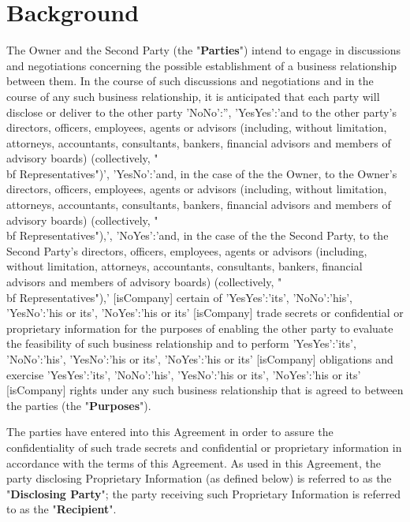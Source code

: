 \documentclass[12pt]{article}
\newcommand{\VAR}[1]{{\color{blue}#1}}
\newcommand{\pronouns}{
    \VAR{
        {
            'YesYes':'its',
            'NoNo':'his',
            'YesNo':'his or its',
            'NoYes':'his or its'
        }[isCompany]
    }
}
\begin{document}
\section{Background}
The Owner and the Second Party (the "{\bf Parties}") intend to engage in discussions and negotiations concerning the possible establishment of a business relationship between them.  In the course of such discussions and negotiations and in the course of any such business relationship, it is anticipated that each party will disclose or deliver to the other party
 \VAR{
    {
        'NoNo':'',
        'YesYes':'and to the other party’s directors, officers, employees, agents or advisors (including, without limitation, attorneys, accountants, consultants, bankers, financial advisors and members of advisory boards) (collectively, "{\\bf Representatives}")',
        'YesNo':'and, in the case of the the Owner, to the Owner’s directors, officers, employees, agents or advisors (including, without limitation, attorneys, accountants, consultants, bankers, financial advisors and members of advisory boards) (collectively, "{\\bf Representatives}"),',
        'NoYes':'and, in the case of the the Second Party, to the Second Party’s directors, officers, employees, agents or advisors (including, without limitation, attorneys, accountants, consultants, bankers, financial advisors and members of advisory boards) (collectively, "{\\bf Representatives}"),'
    }[isCompany]
}
certain of \pronouns trade secrets or confidential or proprietary information for the purposes of enabling the other party to evaluate the feasibility of such business relationship and to perform \pronouns obligations and exercise \pronouns rights under any such business relationship that is agreed to between the parties (the "{\bf Purposes}").

The parties have entered into this Agreement in order to assure the confidentiality of such trade secrets and confidential or proprietary information in accordance with the terms of this Agreement.  As used in this Agreement, the party disclosing Proprietary Information (as defined below) is referred to as the "{\bf Disclosing Party}"; the party receiving such Proprietary Information is referred to as the "{\bf Recipient}".
\end{document}
